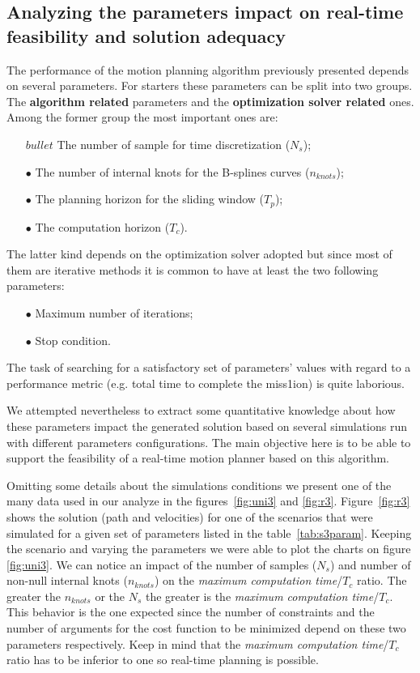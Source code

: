\subsection{Analyzing the parameters impact on real-time feasibility and solution adequacy}

The performance of the motion planning algorithm previously presented depends on several parameters. For starters these parameters can be split into two groups. The \textbf{algorithm related} parameters and the \textbf{optimization solver related} ones. Among the former group the most important ones are:
\begin{itemize}
\item[$bullet$] The number of sample for time discretization ($N_s$);
\item[$\bullet$] The number of internal knots for the B-splines curves ($n_{knots}$);
\item[$\bullet$] The planning horizon for the sliding window ($T_p$);
\item[$\bullet$] The computation horizon ($T_c$).
\end{itemize}

The latter kind depends on the optimization solver adopted but since most of them are iterative methods it is common to have at least the two following parameters:
\begin{itemize}
\item[$\bullet$] Maximum number of iterations;
\item[$\bullet$] Stop condition.
\end{itemize}

The task of searching for a satisfactory set of parameters' values with regard to a performance metric (e.g. total time to complete the miss1ion) is quite laborious.

We attempted nevertheless to extract some quantitative knowledge about how these parameters impact the generated solution based on several simulations run with different parameters configurations. The main objective here is to be able to support the feasibility of a real-time motion planner based on this algorithm.

Omitting some details about the simulations conditions we present one of the many data used in our analyze in the figures~\ref{fig:uni3} and \ref{fig:r3}. Figure~\ref{fig:r3} shows the solution (path and velocities) for one of the scenarios that were simulated for a given set of parameters listed in the table~\ref{tab:s3param}. Keeping the scenario and varying the parameters we were able to plot the charts on figure \ref{fig:uni3}. We can notice an impact of the number of samples ($N_s$) and number of non-null internal knots ($n_{knots}$) on the \textit{maximum computation time}/$T_c$ ratio. The greater the $n_{knots}$ or the $N_s$ the greater is the \textit{maximum computation time}/$T_c$. This behavior is the one expected since the number of constraints and the number of arguments for the cost function to be minimized depend on these two parameters respectively. Keep in mind that the \textit{maximum computation time}/$T_c$ ratio has to be inferior to one so real-time planning is possible.

